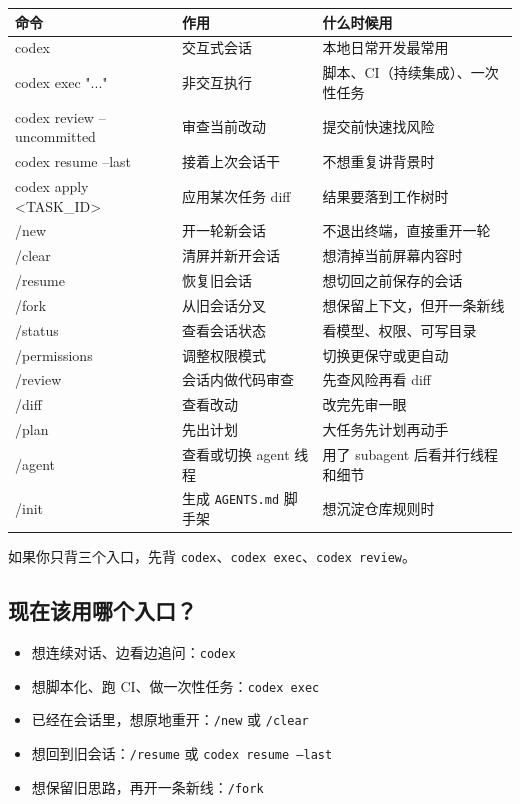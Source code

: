 \documentclass[UTF8,a4paper,11pt]{ctexart}
\begin{document}
\begin{longtable}{>{\ttfamily\raggedright\arraybackslash}p{} >{\raggedright\arraybackslash}p{} >{\raggedright\arraybackslash}p{}}
\toprule
命令 & 作用 & 什么时候用 \\
\midrule
\endhead
codex & 交互式会话 & 本地日常开发最常用 \\
codex exec "..." & 非交互执行 & 脚本、CI（持续集成）、一次性任务 \\
codex review --uncommitted & 审查当前改动 & 提交前快速找风险 \\
codex resume --last & 接着上次会话干 & 不想重复讲背景时 \\
codex apply <TASK\_ID> & 应用某次任务 diff & 结果要落到工作树时 \\
/new & 开一轮新会话 & 不退出终端，直接重开一轮 \\
/clear & 清屏并新开会话 & 想清掉当前屏幕内容时 \\
/resume & 恢复旧会话 & 想切回之前保存的会话 \\
/fork & 从旧会话分叉 & 想保留上下文，但开一条新线 \\
/status & 查看会话状态 & 看模型、权限、可写目录 \\
/permissions & 调整权限模式 & 切换更保守或更自动 \\
/review & 会话内做代码审查 & 先查风险再看 diff \\
/diff & 查看改动 & 改完先审一眼 \\
/plan & 先出计划 & 大任务先计划再动手 \\
/agent & 查看或切换 agent 线程 & 用了 subagent 后看并行线程和细节 \\
/init & 生成 \texttt{AGENTS.md} 脚手架 & 想沉淀仓库规则时 \\
\bottomrule
\end{longtable}

\begin{tipbox}
如果你只背三个入口，先背 \texttt{codex}、\texttt{codex exec}、\texttt{codex review}。
\end{tipbox}

\subsection{现在该用哪个入口？}

\begin{itemize}
  \item 想连续对话、边看边追问：\texttt{codex}
  \item 想脚本化、跑 CI、做一次性任务：\texttt{codex exec}
  \item 已经在会话里，想原地重开：\texttt{/new} 或 \texttt{/clear}
  \item 想回到旧会话：\texttt{/resume} 或 \texttt{codex resume --last}
  \item 想保留旧思路，再开一条新线：\texttt{/fork}
\end{itemize}
\end{document}
